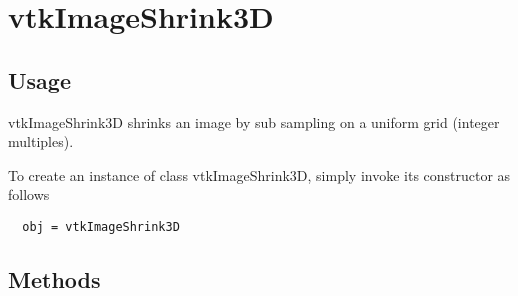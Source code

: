 \section{vtkImageShrink3D}

\subsection{Usage}

 vtkImageShrink3D shrinks an image by sub sampling on a 
 uniform grid (integer multiples).  

To create an instance of class vtkImageShrink3D, simply
invoke its constructor as follows
\begin{verbatim}
  obj = vtkImageShrink3D
\end{verbatim}
\subsection{Methods}

